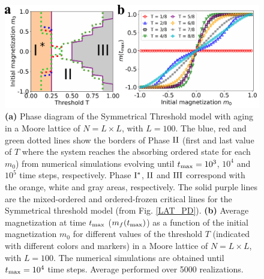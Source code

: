 \begin{figure}
        \centering \captionsetup{font=sf}
        \includegraphics[width=\textwidth]{Figs/Aging_STM/FIG11.pdf}
        \caption[Symmetrical Threshold model with aging in a Moore lattice]{\label{LAT_PDAGING} \textbf{(a)} Phase diagram of the Symmetrical Threshold model with aging in a Moore lattice of $N = L \times L$, with $L = 100$. The blue, red and green dotted lines show the borders of Phase ${\rm II}$ (first and last value of $T$ where the system reaches the absorbing ordered state for each $m_0$) from numerical simulations evolving until $t_{\rm max} = 10^3$, $10^4$ and $10^5$ time steps, respectively. Phase ${\rm I}^{*}$, ${\rm II}$ and ${\rm III}$ correspond with the orange, white and gray areas, respectively. The solid purple lines are the mixed-ordered and ordered-frozen critical lines for the Symmetrical threshold model (from Fig. \ref{LAT_PD}). \textbf{(b)} Average magnetization at time $t_{\rm max}$ ($m_f(t_{\rm max})$) as a function of the initial magnetization $m_0$ for different values of the threshold $T$ (indicated with different colors and markers) in a Moore lattice of $N = L \times L$, with $L = 100$. The numerical simulations are obtained until $t_{\rm max} = 10^4$ time steps. Average performed over 5000 realizations.}
\end{figure}

